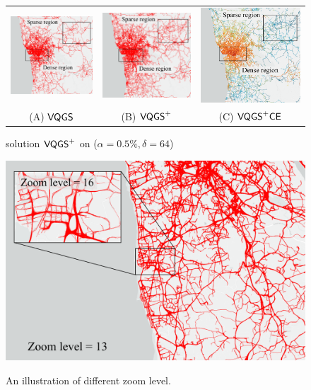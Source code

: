 \begin{figure}
   \begin{minipage}{0.7\textwidth}
     \centering
     \begin{tabular}{ccc}
     \includegraphics[width=0.250\linewidth]{pictures/motivation_VQGS}
     &
     \includegraphics[width=0.250\linewidth]{pictures/motivation_VQGS+d64}
     &
     \includegraphics[width=0.250\linewidth]{pictures/motivation_VQGS+d64CE}
     \\
     (A) $\mathsf{VQGS}$
     &
     (B) $\mathsf{VQGS}^+$
     &
     (C) $\mathsf{VQGS}^+\mathsf{CE}$
     \end{tabular}
     \trim
     \caption{\prob{} solution $\mathsf{VQGS}^+$ on \pt{} ($\alpha = 0.5\%, \delta = 64$)}\label{fig:delta}
   \end{minipage}\hfill
   \begin{minipage}{0.3\textwidth}
     \centering
     \includegraphics[width=0.85\linewidth]{pictures/zoomlevel.pdf}
     \label{Fig:zoom}
     \trim
     \caption{An illustration of different zoom level.}
   \end{minipage}
   \trim
\end{figure}


